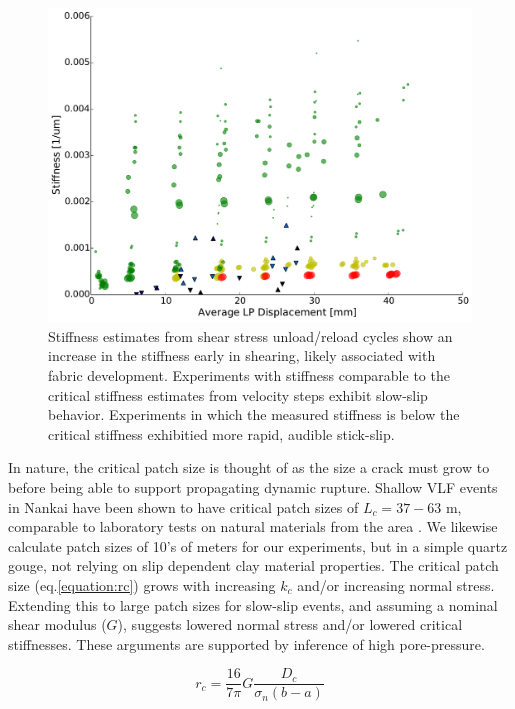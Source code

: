 \documentclass[11pt]{article}
\begin{document}
\begin{figure}
    \centering
        \includegraphics[scale=0.4]{../Figures/Fig_Stiffness_Evolution/Stiffness_Evolution.pdf}
       \caption{Stiffness estimates from shear stress unload/reload cycles show
       an increase in the stiffness early in shearing, likely associated with
       fabric development. Experiments with stiffness comparable to the critical stiffness
       estimates from velocity steps exhibit slow-slip behavior. Experiments in
       which the measured stiffness is below the critical stiffness exhibitied
       more rapid, audible stick-slip.}
      \label{Figure:Stiffness Evolution}
\end{figure}

In nature, the critical patch size is thought of as the size a crack must grow
to before being able to support propagating dynamic rupture. Shallow VLF events in
Nankai have been shown to have critical patch sizes of $L_c = 37-63$ m,
comparable to laboratory tests on natural materials from the area
\cite{Ikari:2013}. We likewise calculate  patch sizes of 10's of meters for our
experiments, but in a simple quartz gouge,  not relying on slip dependent clay
material properties. The critical patch size (eq.\ref{equation:rc}) grows with
increasing $k_c$ and/or increasing normal stress. Extending this to large patch
sizes for slow-slip events, and assuming a nominal shear modulus ($G$), suggests
lowered normal stress and/or lowered critical stiffnesses. These arguments are
supported by inference of high pore-pressure.

\begin{equation}
    r_c = \frac{16}{7\pi}G \frac{D_c}{\sigma_n (b-a)}
    \label{equation:rc}
\end{equation}
\end{document}

